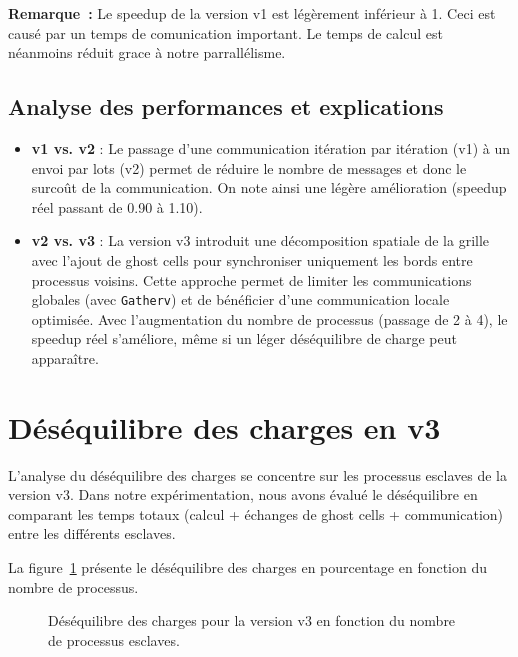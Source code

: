 \documentclass[a4paper,13pt]{book}
\begin{document}
\noindent
\textbf{Remarque~:} Le speedup de la version v1 est légèrement inférieur à 1. Ceci est causé par un temps de comunication important. Le temps de calcul est néanmoins réduit grace à notre parrallélisme.
\subsection{Analyse des performances et explications}

\begin{itemize}
  \item \textbf{v1 vs. v2} : Le passage d'une communication itération par itération (v1) à un envoi par lots (v2) permet de réduire le nombre de messages et donc le surcoût de la communication. On note ainsi une légère amélioration (speedup réel passant de 0.90 à 1.10).
  \item \textbf{v2 vs. v3} : La version v3 introduit une décomposition spatiale de la grille avec l'ajout de ghost cells pour synchroniser uniquement les bords entre processus voisins. Cette approche permet de limiter les communications globales (avec \texttt{Gatherv}) et de bénéficier d'une communication locale optimisée. Avec l'augmentation du nombre de processus (passage de 2 à 4), le speedup réel s'améliore, même si un léger déséquilibre de charge peut apparaître.
\end{itemize}

\section{Déséquilibre des charges en v3}

L'analyse du déséquilibre des charges se concentre sur les processus esclaves de la version v3. Dans notre expérimentation, nous avons évalué le déséquilibre en comparant les temps totaux (calcul + échanges de ghost cells + communication) entre les différents esclaves.

La figure~\ref{fig:imbalance} présente le déséquilibre des charges en pourcentage en fonction du nombre de processus.

\begin{figure}[ht]
  \centering
  \caption{Déséquilibre des charges pour la version v3 en fonction du nombre de processus esclaves.}
  \label{fig:imbalance}
\end{figure}
\end{document}
